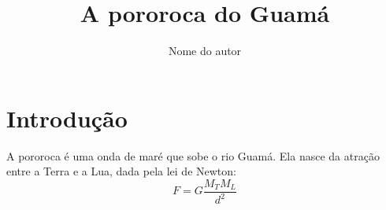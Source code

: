 \documentclass{article}
\title{A pororoca do Guamá}
\author{Nome do autor}
\begin{document}
\maketitle
\section{Introdução}
A pororoca é uma onda de maré que sobe o rio Guamá.
Ela nasce da atração entre a Terra e a Lua,
dada pela lei de Newton:
\begin{equation}
  F = G \frac{M_T M_L}{d^2}
\end{equation}
\end{document}
